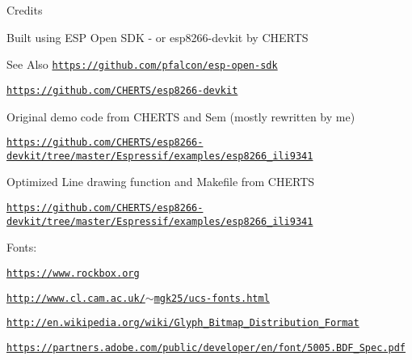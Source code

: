 \begin{DoxyParagraph}{Credits}

\begin{DoxyItemize}
\item Built using E\-S\-P Open S\-D\-K -\/ or esp8266-\/devkit by C\-H\-E\-R\-T\-S 
\end{DoxyItemize}
\end{DoxyParagraph}
\begin{DoxySeeAlso}{See Also}
\href{https://github.com/pfalcon/esp-open-sdk}{\tt https\-://github.\-com/pfalcon/esp-\/open-\/sdk} 

\href{https://github.com/CHERTS/esp8266-devkit}{\tt https\-://github.\-com/\-C\-H\-E\-R\-T\-S/esp8266-\/devkit}
\begin{DoxyItemize}
\item Original demo code from C\-H\-E\-R\-T\-S and Sem (mostly rewritten by me) 
\end{DoxyItemize}

\href{https://github.com/CHERTS/esp8266-devkit/tree/master/Espressif/examples/esp8266_ili9341}{\tt https\-://github.\-com/\-C\-H\-E\-R\-T\-S/esp8266-\/devkit/tree/master/\-Espressif/examples/esp8266\-\_\-ili9341}
\begin{DoxyItemize}
\item Optimized Line drawing function and Makefile from C\-H\-E\-R\-T\-S 
\end{DoxyItemize}

\href{https://github.com/CHERTS/esp8266-devkit/tree/master/Espressif/examples/esp8266_ili9341}{\tt https\-://github.\-com/\-C\-H\-E\-R\-T\-S/esp8266-\/devkit/tree/master/\-Espressif/examples/esp8266\-\_\-ili9341}
\begin{DoxyItemize}
\item Fonts\-: 
\end{DoxyItemize}

\href{https://www.rockbox.org}{\tt https\-://www.\-rockbox.\-org} 

\href{http://www.cl.cam.ac.uk/~mgk25/ucs-fonts.html}{\tt http\-://www.\-cl.\-cam.\-ac.\-uk/$\sim$mgk25/ucs-\/fonts.\-html} 

\href{http://en.wikipedia.org/wiki/Glyph_Bitmap_Distribution_Format}{\tt http\-://en.\-wikipedia.\-org/wiki/\-Glyph\-\_\-\-Bitmap\-\_\-\-Distribution\-\_\-\-Format} 

\href{https://partners.adobe.com/public/developer/en/font/5005.BDF_Spec.pdf}{\tt https\-://partners.\-adobe.\-com/public/developer/en/font/5005.\-B\-D\-F\-\_\-\-Spec.\-pdf} 


\end{DoxySeeAlso}
